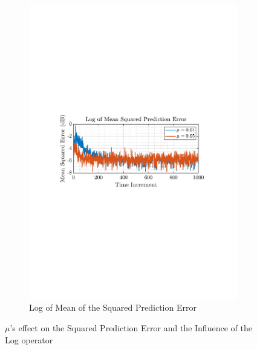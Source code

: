\documentclass[12pt]{article}
\begin{document}
\begin{figure}[H]
\begin{subfigure}{0.49\textwidth}
					\includegraphics[trim={2.2cm 11.2cm 3.15cm  11.2cm}, clip, width=\textwidth]{../MATLAB/figures/q2_1b_fig03.pdf} 
					\captionsetup{justification=centering}
					\caption{Log of Mean of the Squared Prediction Error}
				\end{subfigure}
				\captionsetup{justification=centering}
				\caption{$\mu$'s effect on the Squared Prediction Error and the Influence of the Log operator}
				\label{fig: 2-1b}
			\end{figure}
\end{document}
